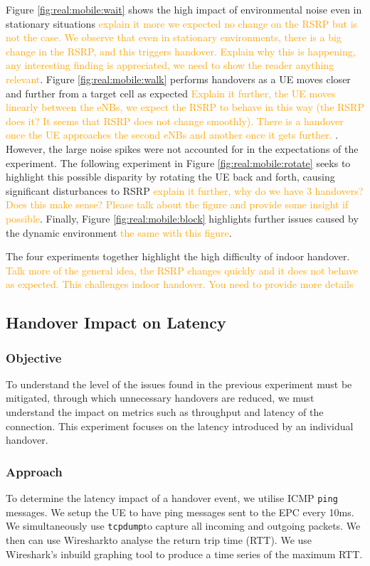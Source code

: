 Figure \ref{fig:real:mobile:wait} shows the high impact of environmental noise even in stationary situations \textcolor{orange}{explain it more we expected no change on the RSRP but is not the case. We observe that even in stationary environments, there is a big change in the RSRP, and this triggers handover. Explain why this is happening, any interesting finding is appreciated, we need to show the reader anything relevant}. Figure \ref{fig:real:mobile:walk} performs handovers as a UE moves closer and further from a target cell as expected \textcolor{orange}{Explain it further, the UE moves linearly between the eNBs, we expect the RSRP to behave in this way (the RSRP does it? It seems that RSRP does not change smoothly). There is a handover once the UE approaches the second eNBs and another once it gets further. }. However, the large noise spikes were not accounted for in the expectations of the experiment. The following experiment in Figure \ref{fig:real:mobile:rotate} seeks to highlight this possible disparity by rotating the UE back and forth, causing significant disturbances to RSRP \textcolor{orange}{explain it further, why do we have 3 handovers? Does this make sense? Please talk about the figure and provide some insight if possible}. Finally, Figure \ref{fig:real:mobile:block} highlights further issues caused by the dynamic environment \textcolor{orange}{the same with this figure}.

The four experiments together highlight the high difficulty of indoor handover. \textcolor{orange}{Talk more of the general idea, the RSRP changes quickly and it does not behave as expected. This challenges indoor handover. You need to provide more details}

\subsection{Handover Impact on Latency}
\label{sec:handover-impact}
\subsubsection{Objective}
To understand the level of the issues found in the previous experiment must be mitigated, through which unnecessary handovers are reduced, we must understand the impact on metrics such as throughput and latency of the connection. This experiment focuses on the latency introduced by an individual handover.

\subsubsection{Approach}
To determine the latency impact of a handover event, we utilise ICMP \texttt{ping} messages. We setup the UE to have ping messages sent to the EPC every 10ms. We simultaneously use \texttt{tcpdump}\insertref to capture all incoming and outgoing packets. We then can use Wireshark\insertref to analyse the return trip time (RTT). We use Wireshark's inbuild graphing tool to produce a time series of the maximum RTT.

